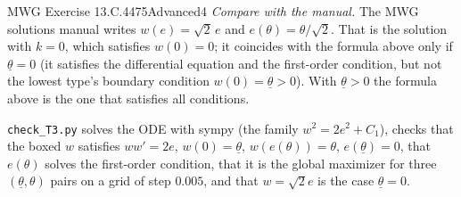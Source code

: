 \begin{exsol}{MWG Exercise 13.C.4}{475}{Advanced}{4}
\emph{Compare with the manual.} The MWG solutions manual writes $w(e) = \sqrt2\, e$ and
$e(\theta) = \theta/\sqrt2$. That is the solution with $k = 0$, which satisfies $w(0) = 0$; it coincides with the
formula above only if $\underline{\theta} = 0$ (it satisfies the differential equation and the first-order
condition, but not the lowest type's boundary condition $w(0) = \underline{\theta} > 0$). With $\underline{\theta}>0$
the formula above is the one that satisfies all conditions.

\verify \texttt{check\_T3.py} solves the ODE with sympy (the family $w^2 = 2e^2 + C_1$), checks that the boxed
$w$ satisfies $w w' = 2e$, $w(0) = \underline{\theta}$, $w(e(\theta)) = \theta$, $e(\underline{\theta}) = 0$, that
$e(\theta)$ solves the first-order condition, that it is the global maximizer for three
$(\underline{\theta}, \theta)$ pairs on a grid of step $0.005$, and that $w = \sqrt2 e$ is the case
$\underline{\theta} = 0$.

\end{exsol}
